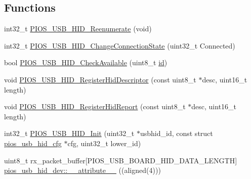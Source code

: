 \subsection*{\-Functions}
\begin{DoxyCompactItemize}
\item 
int32\-\_\-t \hyperlink{group___p_i_o_s___u_s_b___h_i_d_ga4f30a843d1680813d9ae2784e63ba6ff}{\-P\-I\-O\-S\-\_\-\-U\-S\-B\-\_\-\-H\-I\-D\-\_\-\-Reenumerate} (void)
\item 
int32\-\_\-t \hyperlink{group___p_i_o_s___u_s_b___h_i_d_ga7bc7de75840613b8ba148d493d12598b}{\-P\-I\-O\-S\-\_\-\-U\-S\-B\-\_\-\-H\-I\-D\-\_\-\-Change\-Connection\-State} (uint32\-\_\-t \-Connected)
\item 
bool \hyperlink{group___p_i_o_s___u_s_b___h_i_d_ga2d215927e0302a88603e843e9975277e}{\-P\-I\-O\-S\-\_\-\-U\-S\-B\-\_\-\-H\-I\-D\-\_\-\-Check\-Available} (uint8\-\_\-t \hyperlink{uavobjectmanager_8c_abaabdc509cdaba7df9f56c6c76f3ae19}{id})
\item 
void \hyperlink{group___p_i_o_s___u_s_b___h_i_d_gab90f1c47b587196a2db9f82b0893c12b}{\-P\-I\-O\-S\-\_\-\-U\-S\-B\-\_\-\-H\-I\-D\-\_\-\-Register\-Hid\-Descriptor} (const uint8\-\_\-t $\ast$desc, uint16\-\_\-t length)
\item 
void \hyperlink{group___p_i_o_s___u_s_b___h_i_d_ga24ffa70cf0e157835a2e6ea2dfb7f916}{\-P\-I\-O\-S\-\_\-\-U\-S\-B\-\_\-\-H\-I\-D\-\_\-\-Register\-Hid\-Report} (const uint8\-\_\-t $\ast$desc, uint16\-\_\-t length)
\item 
int32\-\_\-t \hyperlink{group___p_i_o_s___u_s_b___h_i_d_ga4ea302beb0afbb7a83ff9ff1b20eb9cc}{\-P\-I\-O\-S\-\_\-\-U\-S\-B\-\_\-\-H\-I\-D\-\_\-\-Init} (uint32\-\_\-t $\ast$usbhid\-\_\-id, const struct \hyperlink{structpios__usb__hid__cfg}{pios\-\_\-usb\-\_\-hid\-\_\-cfg} $\ast$cfg, uint32\-\_\-t lower\-\_\-id)
\item 
uint8\-\_\-t rx\-\_\-packet\-\_\-buffer\mbox{[}\-P\-I\-O\-S\-\_\-\-U\-S\-B\-\_\-\-B\-O\-A\-R\-D\-\_\-\-H\-I\-D\-\_\-\-D\-A\-T\-A\-\_\-\-L\-E\-N\-G\-T\-H\mbox{]} \hyperlink{group___p_i_o_s___u_s_b___h_i_d_ga078ed58bf52ceaf8ee4248216c518445}{pios\-\_\-usb\-\_\-hid\-\_\-dev\-::\-\_\-\-\_\-attribute\-\_\-\-\_\-} ((aligned(4)))
\end{DoxyCompactItemize}
